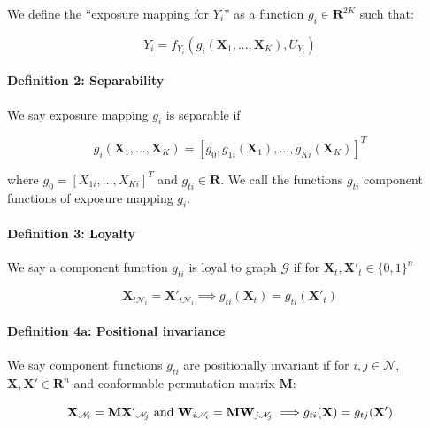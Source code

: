 \documentclass[
  letterpaper,
  DIV=11,
  numbers=noendperiod,
  oneside]{scrreprt}
\let\oldparagraph\paragraph
\renewcommand{\paragraph}[1]{\oldparagraph{#1}\mbox{}}
\begin{document}
We define the ``exposure mapping for \(Y_i\)'' as a function
\(g_i \in \mathbf{R}^{2K}\) such that:

\[
Y_i = f_{Y_i}(g_i(\mathbf{X}_1,  ..., \mathbf{X}_K), U_{Y_i})
\]

\hypertarget{definition-2-separability}{%
\paragraph{\texorpdfstring{\textbf{Definition 2:
Separability}}{Definition 2: Separability}}\label{definition-2-separability}}

We say exposure mapping \(g_i\) is separable if

\[
g_i(\mathbf{X}_{1}, ..., \mathbf{X}_{K}) = [g_0,    g_{1i}(\mathbf{X}_{1}), ...,   g_{Ki}(\mathbf{X}_{K})]^T
\]

where \(g_0 = [X_{1i}, ..., X_{Ki}]^T\) and \(g_{ti} \in \mathbf{R}\).
We call the functions \(g_{ti}\) component functions of exposure mapping
\(g_i\).

\hypertarget{definition-3-loyalty}{%
\paragraph{\texorpdfstring{\textbf{Definition 3:
Loyalty}}{Definition 3: Loyalty}}\label{definition-3-loyalty}}

We say a component function \(g_{ti}\) is loyal to graph \(\mathscr{G}\)
if for \(\mathbf{X}_t,\mathbf{X}'_t \in \{0,1\}^n\)

\[
\begin{equation}
\mathbf{X}_{t\mathscr{N}_i} = \mathbf{X'}_{t\mathscr{N}_i}
\implies 
g_{ti}(\mathbf{X}_t) = g_{ti}( \mathbf{X'}_t) 
\end{equation}
\]

\hypertarget{definition-4a-positional-invariance}{%
\paragraph{\texorpdfstring{\textbf{Definition 4a: Positional
invariance}}{Definition 4a: Positional invariance}}\label{definition-4a-positional-invariance}}

We say component functions \(g_{ti}\) are positionally invariant if for
\(i,j \in \mathscr{N}\), \(\mathbf{X},\mathbf{X}' \in \mathbf{R}^n\) and
conformable permutation matrix \(\mathbf{M}\):

\[
\begin{equation}
\mathbf{X}_{\mathscr{N}_i} = \mathbf{M} \mathbf{X'}_{\mathscr{N}_j} \text{ and } \mathbf{W}_{i\mathscr{N}_i} =  \mathbf{M} \mathbf{W}_{j\mathscr{N}_j}\\
\implies \\
g_{ti}(\mathbf{X}) = g_{tj}(\mathbf{X'}) 
\end{equation}
\]
\end{document}
